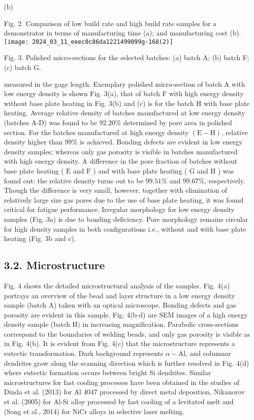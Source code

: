 \documentclass[10pt]{article}
\begin{document}
(b)

Fig. 2. Comparison of low build rate and high build rate samples for a demonstrator in terms of manufacturing time (a); and manufacturing cost (b).\\
\texttt{[image: 2024\_03\_11\_eeec0c86da1221499099g-168(2)]}

Fig. 3. Polished micro-sections for the selected batches: (a) batch A; (b) batch F; (c) batch G.

measured in the gage length. Exemplary polished micro-section of batch A with low energy density is shown Fig. 3(a), that of batch F with high energy density without base plate heating in Fig. 3(b) and (c) is for the batch $\mathrm{H}$ with base plate heating. Average relative density of batches manufactured at low energy density (batches A-D) was found to be $92.20 \%$ determined by pore area in polished section. For the batches manufactured at high energy density $(\mathrm{E}-\mathrm{H})$, relative density higher than $99 \%$ is achieved. Bonding defects are evident in low energy density samples; whereas only gas porosity is visible in batches manufactured with high energy density. A difference in the pore fraction of batches without base plate heating ( $\mathrm{E}$ and $\mathrm{F}$ ) and with base plate heating ( $\mathrm{G}$ and $\mathrm{H}$ ) was found out: the relative density turns out to be $99.51 \%$ and $99.67 \%$, respectively. Though the difference is very small, however, together with elimination of relatively large size gas pores due to the use of base plate heating, it was found critical for fatigue performance. Irregular morphology for low energy density samples (Fig. 3a) is due to bonding deficiency. Pore morphology remains circular for high density samples in both configurations i.e., without and with base plate heating (Fig. 3b and c).

\subsection*{3.2. Microstructure}
Fig. 4 shows the detailed microstructural analysis of the samples. Fig. 4(a) portrays an overview of the bead and layer structure in a low energy density sample (batch A) taken with an optical microscope. Bonding defects and gas porosity are evident in this sample. Fig. 4(b-d) are SEM images of a high energy density sample (batch $\mathrm{H})$ in increasing magnification. Parabolic cross-sections correspond to the boundaries of welding beads, and only gas porosity is visible as in Fig. 4(b). It is evident from Fig. 4(c) that the microstructure represents a eutectic transformation. Dark background represents $\alpha-\mathrm{Al}$, and columnar dendrites grow along the scanning direction which is further resolved in Fig. 4(d) where eutectic formation occurs between bright Si dendrites. Similar microstructures for fast cooling processes have been obtained in the studies of Dinda et al. (2013) for Al 4047 processed by direct metal deposition, Nikanorov et al. (2005) for Al-Si alloy processed by fast cooling of a levitated melt and (Song et al., 2014) for NiCr alloys in selective laser melting.
\end{document}
